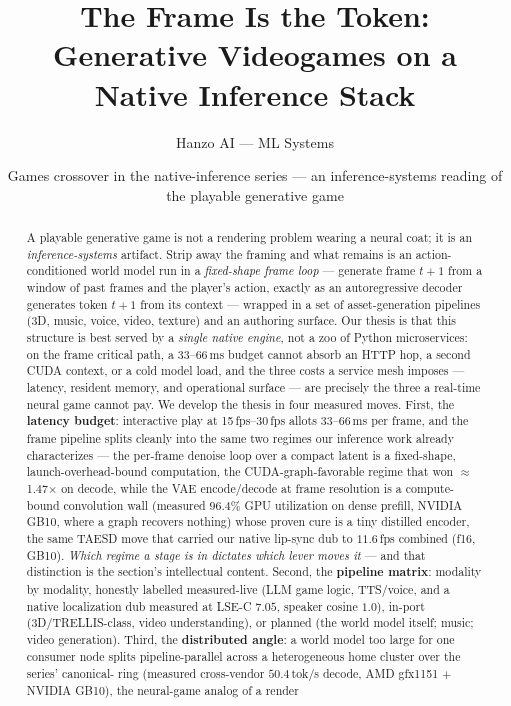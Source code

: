 \documentclass[11pt]{article}
\title{\textbf{The Frame Is the Token:\\ Generative Videogames on a Native Inference Stack}}
\author{Hanzo AI --- ML Systems}
\date{Games crossover in the native-inference series --- an inference-systems reading of the playable generative game}
\newcommand{\fps}[1]{\mbox{#1\,fps}}
\begin{document}
\maketitle

\begin{abstract}
A playable generative game is not a rendering problem wearing a neural coat; it is an
\emph{inference-systems} artifact. Strip away the framing and what remains is an action-conditioned world
model run in a \emph{fixed-shape frame loop} --- generate frame $t{+}1$ from a window of past frames and the
player's action, exactly as an autoregressive decoder generates token $t{+}1$ from its context --- wrapped
in a set of asset-generation pipelines (3D, music, voice, video, texture) and an authoring surface. Our
thesis is that this structure is best served by a \emph{single native engine}, not a zoo of Python
microservices: on the frame critical path, a $33$--$66$\,ms budget cannot absorb an HTTP hop, a second CUDA
context, or a cold model load, and the three costs a service mesh imposes --- latency, resident memory, and
operational surface --- are precisely the three a real-time neural game cannot pay. We develop the thesis in
four measured moves. First, the \textbf{latency budget}: interactive play at \fps{15}--\fps{30} allots
$33$--$66$\,ms per frame, and the frame pipeline splits cleanly into the same two regimes our inference work
already characterizes --- the per-frame denoise loop over a compact latent is a fixed-shape,
launch-overhead-bound computation, the CUDA-graph-favorable regime that won $\approx$1.47$\times$ on decode,
while the VAE encode/decode at frame resolution is a compute-bound convolution wall (measured $96.4\%$ GPU
utilization on dense prefill, NVIDIA GB10, where a graph recovers nothing) whose proven cure is a tiny
distilled encoder, the same TAESD move that carried our native lip-sync dub to $11.6$\,fps combined
(f16, GB10). \emph{Which regime a stage is in dictates which lever moves it} --- and that distinction is the
section's intellectual content. Second, the \textbf{pipeline matrix}: modality by modality, honestly labelled
measured-live (LLM game logic, TTS/voice, and a native localization dub measured at LSE-C $7.05$, speaker
cosine $1.0$), in-port (3D/TRELLIS-class, video understanding), or planned (the world model itself; music;
video generation). Third, the \textbf{distributed angle}: a world model too large for one consumer node
splits pipeline-parallel across a heterogeneous home cluster over the series' canonical- ring
(measured cross-vendor $50.4$\,tok/s decode, AMD gfx1151 $+$ NVIDIA GB10), the neural-game analog of a render

\end{abstract}
\end{document}
